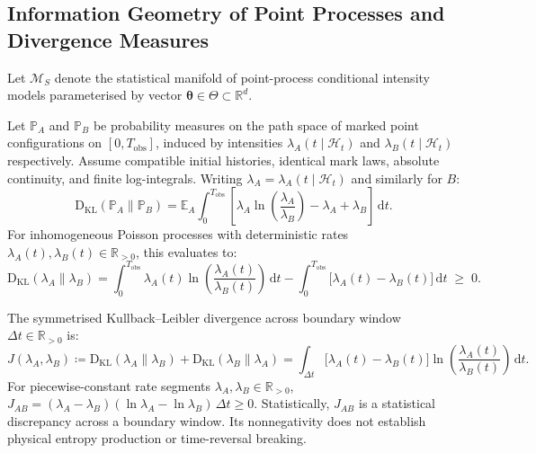 \subsection{Information Geometry of Point Processes and Divergence Measures}
\label{subsec:information_geometry}

Let $\mathcal{M}_S$ denote the statistical manifold of point-process
conditional intensity models parameterised by vector
$\bm{\theta} \in \Theta \subset \mathbb{R}^d$.

\begin{theorem}
  \label{thm:pp_kl_divergence}
  Let $\mathbb{P}_A$ and $\mathbb{P}_B$ be probability measures on
  the path space of marked point configurations on $[0,
  T_{\mathrm{obs}}]$, induced by intensities $\lambda_A(t \mid
  \mathcal{H}_t)$ and $\lambda_B(t \mid \mathcal{H}_t)$
  respectively. Assume compatible initial histories, identical mark
  laws, absolute continuity, and finite log-integrals. Writing
  $\lambda_A=\lambda_A(t\mid\mathcal H_t)$ and similarly for $B$:
  \begin{equation}
    \mathrm D_{\mathrm{KL}}(\mathbb P_A\parallel\mathbb P_B)
    =\mathbb E_A\!\int_0^{T_{\mathrm{obs}}}
    \left[\lambda_A\ln\!\left(\frac{\lambda_A}{\lambda_B}\right)
    -\lambda_A+\lambda_B\right]\,\mathrm{d}t.
    \label{eq:pp_kl_divergence}
  \end{equation}
  For inhomogeneous Poisson processes with deterministic rates
  $\lambda_A(t), \lambda_B(t) \in \mathbb{R}_{>0}$, this evaluates to:
  \begin{equation}
    \mathrm{D}_{\mathrm{KL}}(\lambda_A \parallel \lambda_B) =
    \int_0^{T_{\mathrm{obs}}} \lambda_A(t)
    \ln\!\left(\frac{\lambda_A(t)}{\lambda_B(t)}\right)\,\mathrm{d}t -
    \int_0^{T_{\mathrm{obs}}} \bigl[\lambda_A(t) -
    \lambda_B(t)\bigr]\,\mathrm{d}t \;\ge\; 0.
    \label{eq:poisson_kl_explicit}
  \end{equation}
\end{theorem}

\begin{definition}
  \label{def:jeffreys_divergence}
  The symmetrised Kullback--Leibler divergence across boundary
  window $\Delta t \in \mathbb{R}_{>0}$ is:
  \begin{equation}
    J(\lambda_A, \lambda_B) \coloneqq
    \mathrm{D}_{\mathrm{KL}}(\lambda_A \parallel \lambda_B) +
    \mathrm{D}_{\mathrm{KL}}(\lambda_B \parallel \lambda_A) =
    \int_{\Delta t} \bigl[\lambda_A(t) - \lambda_B(t)\bigr]
    \ln\!\left(\frac{\lambda_A(t)}{\lambda_B(t)}\right)\,\mathrm{d}t.
    \label{eq:jeffreys_divergence}
  \end{equation}
  For piecewise-constant rate segments $\lambda_A, \lambda_B \in
  \mathbb{R}_{>0}$, $J_{AB} = (\lambda_A - \lambda_B)(\ln \lambda_A
  - \ln \lambda_B)\,\Delta t \ge 0$. Statistically, $J_{AB}$ is
  a statistical discrepancy across a boundary window. Its nonnegativity
  does not establish physical entropy production or time-reversal breaking.
\end{definition}

